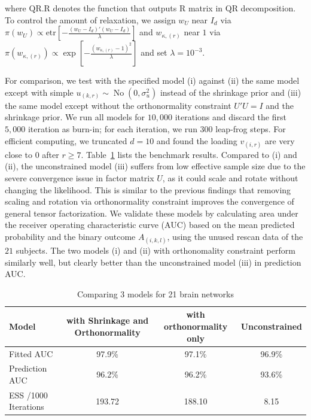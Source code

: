 \documentclass[10pt,fleqn]{article}
\DeclareMathOperator{\No}{No}
\DeclareMathOperator{\1}{\mathbbm{1}}
\begin{document}
where $\text{QR.R}$ denotes the function that outputs $\text{R}$ matrix in
QR decomposition.
To control the amount of relaxation, we assign $w_U$ near $I_d$ via $\pi(w_U)\propto \text{etr}\left[ -\frac{(w_U-I_d)'(w_U-I_d)}{\lambda}\right]$ and $w_{\kappa,{(r)}}$
near $1$ via $\pi(w_{\kappa,{(r)}})\propto \exp\left[ -\frac{(w_{\kappa,{(r)}}-1)^2}{\lambda}\right]$ and set $\lambda=10^{-3}$.


For comparison, we test with the specified model (i) against (ii) the  same
model except with simple $u_{(k,r)}\sim \No (0,\sigma^2_u)$ instead of the shrinkage prior and (iii) the  same
model except  without the orthonormality constraint $U'U=I$ and the shrinkage prior.
We run all models for $10,000$ iterations and discard the first $5,000$ iteration
as burn-in;
for each iteration, we run $300$ leap-frog steps.
For efficient computing, we truncated $d=10$ and found the loading $v_{(i,r)}$
are very close to $0$ after $r\ge 7$. Table~\ref{network_model} lists the benchmark results. Compared to (i) and
(ii), the unconstrained model (iii) suffers from low effective sample
size due to the severe convergence issue in factor matrix $U$, as it could
scale and rotate without changing the likelihood. This is similar  to
the previous findings \citep{hoff2016equivariant} that
 removing scaling and rotation
via orthonormality constraint  improves the convergence of general tensor
factorization.
We validate these models by calculating area under the receiver operating characteristic curve  (AUC) based on the mean predicted probability and the binary outcome $A_{(i,k,l)}$, using the unused rescan data of the $21$ subjects.
The two  models (i) and (ii) with orthonomality constraint perform similarly well, but clearly better than 
the unconstrained model (iii) in prediction AUC.  
 \begin{table}[H]
   \begin{center}
   \tiny
   \begin{tabular}{ l| c | c| c }
   \hline     
 Model   &  with Shrinkage and Orthonormality    & with  orthonormality only  & Unconstrained \\         
       \hline           
     Fitted AUC &  97.9\%  & 97.1\%  & 96.9\%     \\
   \hline
     Prediction AUC & 96.2\% & 96.2\%  & 93.6\%      \\
   \hline
   ESS /1000 Iterations &  193.72  & 188.10  & 8.15     \\
   \hline  
   \end{tabular}
   \end{center}
   \caption{Comparing 3 models for 21 brain networks
   \label{network_model}}
   \end{table}
\end{document}

